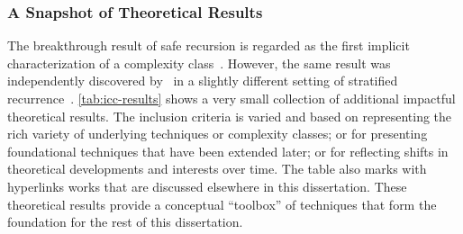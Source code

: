\subsubsection{A Snapshot of Theoretical Results}
\label{icc-theories}

The breakthrough result of safe recursion is regarded as the first implicit characterization of a complexity class~\cite{dallago2011,kristiansen2017,rubiano17}.
However, the same result was independently discovered by~\textcite{leivant1993} in a slightly different setting of stratified recurrence~\cite[p. 762]{dallago2022}.
\autoref{tab:icc-results} shows a {very small} collection of additional impactful theoretical results.
The inclusion criteria is varied and based on representing the rich variety of underlying techniques or complexity classes;
or for presenting foundational techniques that have been extended later;
or for reflecting shifts in theoretical developments and interests over time.
The table also marks with hyperlinks works that are discussed elsewhere in this dissertation.
These theoretical results provide a conceptual \enquote{toolbox} of techniques that form the foundation
for the rest of this dissertation.

